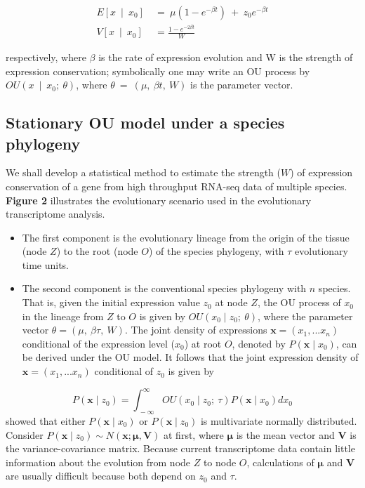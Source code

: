 \documentclass[]{book}
\providecommand{\tightlist}{%
  \setlength{\itemsep}{0pt}\setlength{\parskip}{0pt}}
\begin{document}
\[
\begin{split}
E\left[x\  \mid\  x_0\right]\  &=\  \mu\left(1-e^{-\beta t}\right)\  +\  z_0e^{-\beta t} \\
V\left[x\  \mid\  x_0\right]\  &=\frac{1-e^{-2\beta t}}{W}
\end{split}\tag{3.1}
\]

respectively, where \(\beta\) is the rate of expression evolution and W is the strength of expression conservation; symbolically one may write an OU process by \(OU\left(x\  \mid\  x_0;\  \theta\right)\), where \(\theta\  =\  \left(\mu,\  \beta t,\  W\right)\) is the parameter vector.

\hypertarget{stationary-ou-model-under-a-species-phylogeny}{%
\subsection{Stationary OU model under a species phylogeny}\label{stationary-ou-model-under-a-species-phylogeny}}

We shall develop a statistical method to estimate the strength (\(W\)) of expression conservation of a gene from high throughput RNA-seq data of multiple species. \textbf{Figure 2} illustrates the evolutionary scenario used in the evolutionary transcriptome analysis.

\begin{itemize}
\tightlist
\item
  The first component is the evolutionary lineage from the origin of the tissue (node \(Z\)) to the root (node \(O\)) of the species phylogeny, with \(\tau\) evolutionary time units.
\item
  The second component is the conventional species phylogeny with \(n\) species. That is, given the initial expression value \(z_0\) at node \(Z\), the OU process of \(x_0\) in the lineage from \(Z\) to \(O\) is given by \(OU\left(x_0\mid z_0;\  \theta\right)\), where the parameter vector \(\theta=\left(\mu,\  \beta\tau,\  W\right)\). The joint density of expressions \(\boldsymbol{x}=\left(x_1,...x_n\right)\) conditional of the expression level (\(x_0\)) at root \(O\), denoted by \(P\left(\boldsymbol{x}\mid x_0\right)\), can be derived under the OU model. It follows that the joint expression density of \(\boldsymbol{x}=\left(x_1,...x_n\right)\) conditional of \(z_0\) is given by
\end{itemize}

\[P\left(\boldsymbol{x}\mid z_0\right)=\int_{\  -\infty}^{\infty}OU\left(x_0\mid z_0;\  \tau\right)P\left(\boldsymbol{x}\mid x_0\right)dx_0\tag{3.2}\]
\citep{hansen1996} showed that either \(P\left(\boldsymbol{x}\mid x_0\right)\) or \(P\left(\boldsymbol{x}\mid z_0\right)\) is multivariate normally distributed. Consider \(P\left(\boldsymbol{x}\mid z_0\right)\sim N\left(\boldsymbol{x}; \boldsymbol{\mu}, \boldsymbol{V}\right)\) at first, where \(\boldsymbol{\mu}\) is the mean vector and \(\boldsymbol{V}\) is the variance-covariance matrix. Because current transcriptome data contain little information about the evolution from node \(Z\) to node \(O\), calculations of \(\boldsymbol{\mu}\) and \(\boldsymbol{V}\) are usually difficult because both depend on \(z_0\) and \(\tau\).
\end{document}
